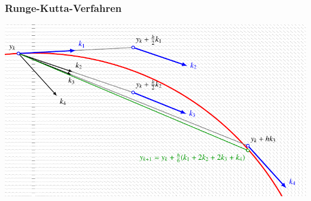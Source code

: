 %
%
%
\begin{frame}
\frametitle{Runge-Kutta-Verfahren}
\begin{center}
\includegraphics[width=\hsize]{../../buch/chapters/50-ode/figures/rungekutta.pdf}
\end{center}
\end{frame}
